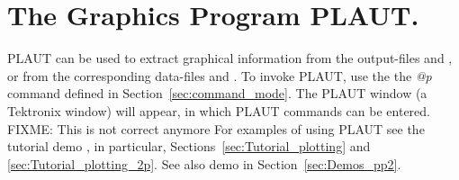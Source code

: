 \chapter{ The Graphics Program PLAUT.} \label{ch:PLAUT}
{\cal PLAUT} can be used to extract graphical
information from the \AUTO output-files  and ,
or from the corresponding data-files  and .
To invoke {\cal PLAUT}, use the the {\it @p} command defined in 
Section~\ref{sec:command_mode}.
The {\cal PLAUT} window (a Tektronix window) will appear, in which {\cal PLAUT}
commands can be entered.
FIXME:  This is not correct anymore
For examples of using {\cal PLAUT} see the tutorial demo , in particular,
Sections~\ref{sec:Tutorial_plotting} and \ref{sec:Tutorial_plotting_2p}.
See also demo  in Section~\ref{sec:Demos_pp2}.


